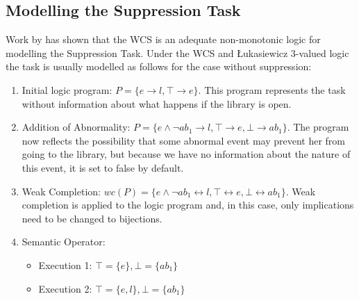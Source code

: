 \subsection{Modelling the Suppression Task} \label{ssec:sup_mod}
Work by \cite{dietz2014modeling} has shown that the WCS is an adequate non-monotonic logic for modelling the Suppression Task. Under the WCS and \L ukasiewicz 3-valued logic the task is usually modelled as follows for the case without suppression:
\begin{enumerate}
\item Initial logic program: $P = \{e \rightarrow l, \top \rightarrow e \}$. This program represents the task without information about what happens if the library is open.
\item Addition of Abnormality: $P = \{e \land \lnot ab_1 \rightarrow l, \top \rightarrow e, \bot \rightarrow ab_1 \}$. The program now reflects the possibility that some abnormal event may prevent her from going to the library, but because we have no information about the nature of this event, it is set to false by default.
\item Weak Completion: $wc(P) = \{e \land \lnot ab_1 \leftrightarrow l, \top \leftrightarrow e, \bot \leftrightarrow ab_1 \}$. Weak completion is applied to the logic program and, in this case, only implications need to be changed to bijections.
\item Semantic Operator:
\begin{itemize}
\item Execution 1: $\top=\{e\}, \bot=\{ab_1\}$
\item Execution 2: $\top=\{e,l\}, \bot=\{ab_1\}$
\end{itemize}
\end{enumerate}

